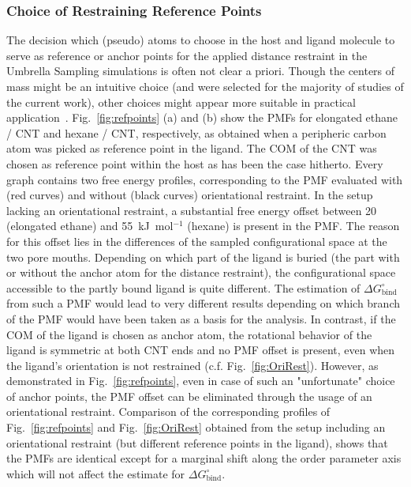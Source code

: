 \documentclass[9pt,lessons]{livecoms}
\begin{document}
\subsubsection*{Choice of Restraining Reference Points}
\label{subsec:refpoints}

The decision which (pseudo) atoms to choose in the host and ligand molecule to serve as reference or anchor points for the applied distance restraint in the Umbrella Sampling simulations is often not clear a priori.
Though the centers of mass might be an intuitive choice (and were selected for the majority of studies of the current work), other choices might appear more suitable in practical application~\cite{doudou2009standard}.
Fig.~\ref{fig:refpoints} (a) and (b) show the PMFs for elongated ethane / CNT and hexane / CNT, respectively, as obtained when a peripheric carbon atom was picked as reference point in the ligand.
The COM of the CNT was chosen as reference point within the host as has been the case hitherto.  
Every graph contains two free energy profiles, corresponding to the PMF evaluated with (red curves) and without (black curves) orientational restraint.
In the setup lacking an orientational restraint, a substantial free energy offset between 20 (elongated ethane) and 55~kJ~mol$^{-1}$ (hexane) is present in the PMF.
The reason for this offset lies in the differences of the sampled configurational space at the two pore mouths. 
Depending on which part of the ligand is buried (the part with or without the anchor atom for the distance restraint), the configurational space accessible to the partly bound ligand is quite different. 
The estimation of  $\Delta G^\circ_\mathrm{bind}$ from such a PMF would lead to very different results depending on which branch of the PMF would have been taken as a basis for the analysis.
In contrast, if the COM of the ligand is chosen as anchor atom, the rotational behavior of the ligand is symmetric at both CNT ends and no PMF offset is present, even when the ligand's orientation is not restrained 
(c.f. Fig.~\ref{fig:OriRest}). 
However, as demonstrated in Fig.~\ref{fig:refpoints}, even in case of such an "unfortunate" choice of anchor points, the PMF offset can be eliminated through the usage of an orientational restraint.
Comparison of the corresponding profiles of Fig.~\ref{fig:refpoints} and Fig.~\ref{fig:OriRest} obtained from the setup including an orientational restraint (but different reference points in the ligand), 
shows that the PMFs are identical except for a marginal shift along the order parameter axis which will not affect the estimate for $\Delta G^\circ_\mathrm{bind}$.
\end{document}
